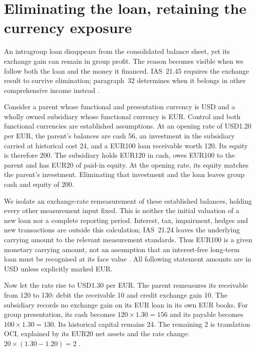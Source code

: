 
\clearpage
\section{Eliminating the loan, retaining the currency exposure}
\label{sec:intragroup-fx-example}

An intragroup loan disappears from the consolidated balance sheet, yet its
exchange gain can remain in group profit. The reason becomes visible when
we follow both the loan and the money it financed. IAS~21.45 requires the
exchange result to survive elimination; paragraph~32 determines when it
belongs in other comprehensive income instead
\citep[IAS~21.32--33, .45]{eu20231803}.

Consider a parent whose functional and presentation currency is USD and a
wholly owned subsidiary whose functional currency is EUR. Control and both
functional currencies are established assumptions. At an opening rate of
USD1.20 per EUR, the parent's balances are cash 56, an investment in the
subsidiary carried at historical cost 24, and a EUR100 loan receivable worth
120. Its equity is therefore 200. The subsidiary holds EUR120 in cash,
owes EUR100 to the parent and has EUR20 of paid-in equity. At the opening
rate, its equity matches the parent's investment. Eliminating that
investment and the loan leaves group cash and equity of 200.

We isolate an exchange-rate remeasurement of these established balances,
holding every other measurement input fixed. This is neither the initial
valuation of a new loan nor a complete reporting period. Interest, tax,
impairment, hedges and new transactions are outside this calculation;
IAS~21.24 leaves the underlying carrying amount to the relevant measurement
standards. Thus EUR100 is a given monetary carrying amount, not an assumption
that an interest-free long-term loan must be recognised at its face value
\citep[IAS~21.23--24, .50]{eu20231803}. All following statement amounts are
in USD unless explicitly marked EUR.

Now let the rate rise to USD1.30 per EUR. The parent remeasures its receivable
from 120 to 130: debit the receivable 10 and credit exchange gain 10. The
subsidiary records no exchange gain on its EUR loan in its own EUR books.
For group presentation, its cash becomes $120\times1.30=156$ and its payable
becomes $100\times1.30=130$. Its historical capital remains 24. The remaining
2 is translation OCI, explained by its EUR20 net assets and the rate change:
$20\times(1.30-1.20)=2$
\citep[IAS~21.28, .33, .39--41]{eu20231803}.

